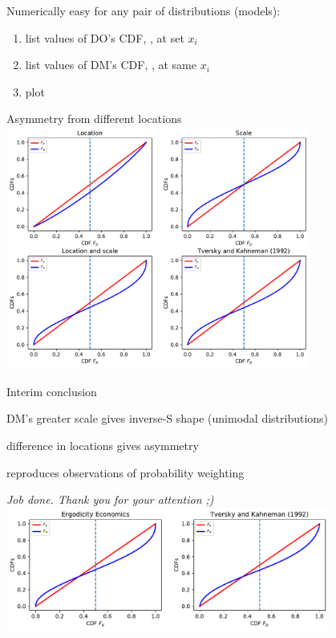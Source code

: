 \begin{frame}
Numerically easy for any pair of distributions (models):
\begin{enumerate}
	\item list values of DO's CDF, , at set ${x_i}$
	\item list values of DM's CDF, , at same ${x_i}$
	\item plot  \vs {}
\end{enumerate}
\end{frame}

\begin{frame}{Asymmetry from different locations}
\centering
	\includegraphics[width=0.75\textwidth]{../../figs/Gauss_scale_location_both_KT.pdf}
	\label{LocationScale}
\end{frame}


\begin{frame}{Interim conclusion}
\bi
	\item DM's greater scale gives inverse-S shape (unimodal distributions)
	\item difference in locations gives asymmetry
	\item reproduces observations of probability weighting
	\item[]
	\item[] \textit{Job done. Thank you for your attention ;)}
	\hfill
	\hyperlink{FunctionalForms}{}
	\label{InterimConclusion}
\ei
	\vspace{2em}
	\centering
	\includegraphics[width=0.8\textwidth]{../../figs/Our_result_LocScale_vs_KT.pdf}
\end{frame}


